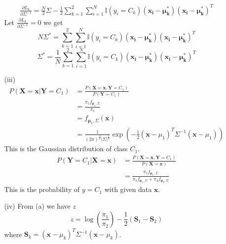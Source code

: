 \documentclass[12pt,a4paper]{article}
\begin{document}
\begin{enumerate}
\begin{enumerate}
                \begin{align*}
                    \frac{\partial L_{k}}{\partial \Sigma^{-1}} = \frac{N}{2}\Sigma - \frac{1}{2}\sum_{k=1}^{2}\sum_{i=1}^{N}\mathbb{I} (y_{i}=C_{k})(\mathbf{x_{i}-\mu_{k}^{*}}) (\mathbf{x_{i}-\mu_{k}^{*}})^T
                \end{align*}
                Let $\frac{\partial L_{k}}{\partial \Sigma^{-1}} = 0$ we get 
                \[
                    N\Sigma^{*} = \sum_{k=1}^{2}\sum_{i=1}^{N}\mathbb{I} (y_{i}=C_{k})(\mathbf{x_{i}-\mu_{k}^{*}})(\mathbf{x_{i}-\mu_{k}^{*}})^T
                \]
                \[
                    \Sigma^{*} = \frac{1}{N}\sum_{k=1}^{2}\sum_{i=1}^{N}\mathbb{I} (y_{i}=C_{k})(\mathbf{x_{i}-\mu_{k}^{*}})(\mathbf{x_{i}-\mu_{k}^{*}})^T
                \]
            \item [(iii)]
                \begin{align*}
                    P(\mathbf{X}=\mathbf{x}|\mathbf{Y}=C_{1}) 
                        &= \frac{P(\mathbf{X}=\mathbf{x}, \mathbf{Y}=C_{1})}{P(\mathbf{Y}=C_{1})} \\
                        &= \frac{\pi_{1}f_{\mathbf{\mu}_{1}, \Sigma}}{\pi_{1}} \\
                        &= f_{\mathbf{\mu}_{1}, \Sigma} (\mathbf{x})\\
                        &= \frac{1}{(2\pi)^{\frac{d}{2}} |\Sigma|^{\frac{1}{2}} } \exp\left( -\frac{1}{2}(\mathbf{x}-\mu_{1})^T\Sigma^{-1}(\mathbf{x}-\mu_{1})\right)
                \end{align*}
                This is the Gaussian distribution of class $C_{1}$.
                \begin{align*}
                    P(\mathbf{Y}=C_{1}|\mathbf{X}=\mathbf{x}) 
                        &= \frac{P(\mathbf{X}=\mathbf{x}, \mathbf{Y}=C_{1})}{P(\mathbf{X}=\mathbf{x})} \\
                        &= \frac{\pi_{1}f_{\mathbf{\mu}_{1}, \Sigma}}{\pi_{1}f_{\mathbf{\mu}_{1}, \Sigma}+\pi_{2}f_{\mathbf{\mu}_{2}, \Sigma}}
                \end{align*}
                This is the probability of $y=C_{1}$ with given data $\mathbf{x}$.
            \item [(iv)]
                From (a) we have $z$
                \[
                    z = \log(\frac{\pi_{1}}{\pi_{2}})  - \frac{1}{2} (\mathbf{S}_{1} - \mathbf{S}_{2}) 
                \]
                where $\mathbf{S}_{k} = (\mathbf{x}-\mu_{k})^T\Sigma^{-1}(\mathbf{x}-\mu_{k})$.
                

\end{enumerate}
\end{enumerate}
\end{document}
